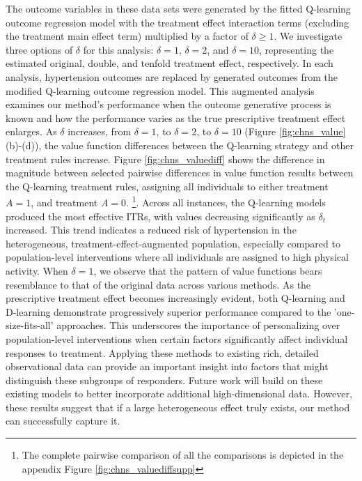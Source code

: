 \documentclass{article}
\begin{document}
 The outcome variables in these data sets were generated by the fitted Q-learning outcome regression model with the treatment effect interaction terms (excluding the treatment main effect term) multiplied by a factor of $\delta \geq 1$. We investigate three options of $\delta$ for this analysis: $\delta=1$, $\delta=2$, and $\delta=10$, representing the estimated original, double, and tenfold treatment effect, respectively. In each analysis, hypertension outcomes are replaced by generated outcomes from the modified Q-learning outcome regression model. This augmented analysis examines our method's performance when the outcome generative process is known and how the performance varies as the true prescriptive treatment effect enlarges. As $\delta$ increases, from $\delta=1$, to $\delta=2$, to  $\delta=10$ (Figure \ref{fig:chns_value} (b)-(d)),  the value function differences between the Q-learning strategy and other treatment rules increase. Figure \ref{fig:chns_valuediff} shows the difference in magnitude between selected pairwise differences in value function results between the Q-learning treatment rules,  assigning all individuals to either treatment $A = 1$, and treatment $A = 0$. \footnote{The complete pairwise comparison of all the comparisons is depicted in the appendix Figure \ref{fig:chns_valuediffsupp}}. Across all instances, the Q-learning models produced the most effective ITRs, with values decreasing significantly as $\delta_t$ increased. This trend indicates a reduced risk of hypertension in the heterogeneous, treatment-effect-augmented population, especially compared to population-level interventions where all individuals are assigned to high physical activity. When $\delta=1$, we observe that the pattern of value functions bears resemblance to that of the original data across various methods. As the prescriptive treatment effect becomes increasingly evident, both Q-learning and D-learning demonstrate progressively superior performance compared to the 'one-size-fits-all' approaches. This underscores the importance of personalizing over population-level interventions when certain factors significantly affect individual responses to treatment. Applying these methods to existing rich, detailed observational data can provide an important insight into factors that might distinguish these subgroups of responders. Future work will build on these existing models to better incorporate additional high-dimensional data. However, these results suggest that if a large heterogeneous effect truly exists, our method can successfully capture it. 
\end{document}

